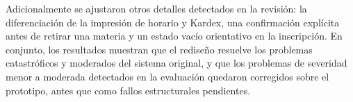 Adicionalmente se ajustaron otros detalles detectados en la revisión: la diferenciación de la impresión de horario y Kardex, una confirmación explícita antes de retirar una materia y un estado vacío orientativo en la inscripción. En conjunto, los resultados muestran que el rediseño resuelve los problemas catastróficos y moderados del sistema original, y que los problemas de severidad menor a moderada detectados en la evaluación quedaron corregidos sobre el prototipo, antes que como fallos estructurales pendientes.
